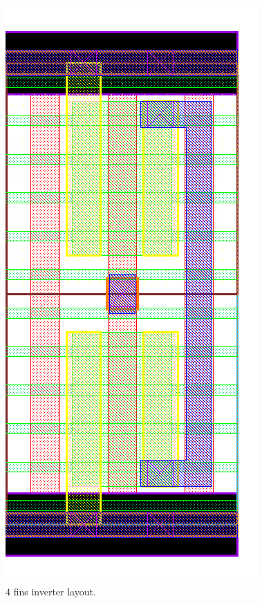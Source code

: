 \documentclass[pgmicro,mestrado,english]{iiufrgs}
\begin{document}
\begin{figure}[]
\centering
\includegraphics[width=\textwidth,height=\textheight,keepaspectratio]{INV4F.png}
\caption{4 fins inverter layout.}
\label{fig:INV4F}
\end{figure}
\end{document}
